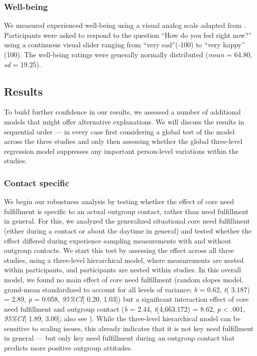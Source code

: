 \subsubsection{Well-being}

We measured experienced well-being using a visual analog scale adapted
from \citet{davies2022}. Participants were asked to respond to the
question ``How do you feel right now?'' using a continuous visual slider
ranging from ``very sad''(-100) to ``very happy'' (100). The well-being
ratings were generally normally distributed (\textit{mean} = 64.80,
\textit{sd} = 19.25).

\subsection{Results}

To build further confidence in our results, we assessed a number of
additional models that might offer alternative explanations. We will
discuss the results in sequential order --- in every case first
considering a global test of the model across the three studies and
only then assessing whether the global three-level regression model
suppresses any important person-level variations within the studies.

\subsubsection{Contact specific}

We begin our robustness analysis by testing whether the effect of core
need fulfillment is specific to an actual outgroup contact, rather than
need fulfillment in general. For this, we analyzed the generalized
situational core need fulfillment (either during a contact or about the
daytime in general) and tested whether the effect differed during
experience sampling measurements with and without outgroup contacts. We
start this test by assessing the effect across all three studies, using
a three-level hierarchical model, where measurements are nested within
participants, and participants are nested within studies. In this
overall model, we found no main effect of core need fulfillment (random
slopes model, grand-mean standardized to account for all levels of
variance; \textit{b} = 0.62, \textit{t}( 3.187) = 2.89, \textit{p} =
0.058, \textit{95\%CI}{[} 0.20, 1.03{]}) but a significant interaction
effect of core need fulfillment and outgroup contact (\textit{b} = 2.44,
\textit{t}(4,663.172) = 8.62, \textit{p} \textless{} .001,
\textit{95\%CI}{[} 1.89, 3.00{]}; also see
). While the three-level hierarchical
model can be sensitive to scaling issues, this already indicates that it
is not key need fulfillment in general --- but only key need fulfillment
during an outgroup contact that predicts more positive outgroup
attitudes.

